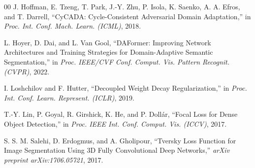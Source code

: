 \documentclass[conference]{IEEEtran}
\begin{document}
\begin{thebibliography}{00}
J. Hoffman, E. Tzeng, T. Park, J.-Y. Zhu, P. Isola, K. Saenko, A. A. Efros, and T. Darrell,
``CyCADA: Cycle-Consistent Adversarial Domain Adaptation,''
in \textit{Proc. Int. Conf. Mach. Learn. (ICML)}, 2018.

L. Hoyer, D. Dai, and L. Van Gool,
``DAFormer: Improving Network Architectures and Training Strategies for Domain-Adaptive Semantic Segmentation,''
in \textit{Proc. IEEE/CVF Conf. Comput. Vis. Pattern Recognit. (CVPR)}, 2022.

I. Loshchilov and F. Hutter,
``Decoupled Weight Decay Regularization,''
in \textit{Proc. Int. Conf. Learn. Represent. (ICLR)}, 2019.

T.-Y. Lin, P. Goyal, R. Girshick, K. He, and P. Doll{\'a}r,
``Focal Loss for Dense Object Detection,''
in \textit{Proc. IEEE Int. Conf. Comput. Vis. (ICCV)}, 2017.

S. S. M. Salehi, D. Erdogmus, and A. Gholipour,
``Tversky Loss Function for Image Segmentation Using 3D Fully Convolutional Deep Networks,''
\textit{arXiv preprint arXiv:1706.05721}, 2017.

\end{thebibliography}
\end{document}
